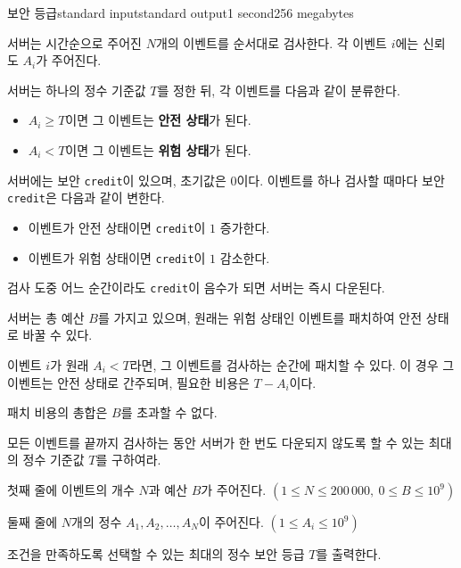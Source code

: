 \begin{problem}{보안 등급}{standard input}{standard output}{1 second}{256 megabytes}

서버는 시간순으로 주어진 $N$개의 이벤트를 순서대로 검사한다.
각 이벤트 $i$에는 신뢰도 $A_i$가 주어진다.

서버는 하나의 정수 기준값 $T$를 정한 뒤, 각 이벤트를 다음과 같이 분류한다.

\begin{itemize}
    \item $A_i \ge T$이면 그 이벤트는 \textbf{안전 상태}가 된다.
    \item $A_i < T$이면 그 이벤트는 \textbf{위험 상태}가 된다.
\end{itemize}

서버에는 보안 \texttt{credit}이 있으며, 초기값은 $0$이다.
이벤트를 하나 검사할 때마다 보안 \texttt{credit}은 다음과 같이 변한다.

\begin{itemize}
    \item 이벤트가 안전 상태이면 \texttt{credit}이 $1$ 증가한다.
    \item 이벤트가 위험 상태이면 \texttt{credit}이 $1$ 감소한다.
\end{itemize}

검사 도중 어느 순간이라도 \texttt{credit}이 음수가 되면 서버는 즉시 다운된다.

서버는 총 예산 $B$를 가지고 있으며, 원래는 위험 상태인 이벤트를 패치하여 안전 상태로 바꿀 수 있다.

이벤트 $i$가 원래 $A_i < T$라면, 그 이벤트를 검사하는 순간에 패치할 수 있다.
이 경우 그 이벤트는 안전 상태로 간주되며, 필요한 비용은 $T - A_i$이다.

패치 비용의 총합은 $B$를 초과할 수 없다.

모든 이벤트를 끝까지 검사하는 동안 서버가 한 번도 다운되지 않도록 할 수 있는 최대의 정수 기준값 $T$를 구하여라.

\InputFile
첫째 줄에 이벤트의 개수 $N$과 예산 $B$가 주어진다.
$(1 \le N \le 200\,000,\ 0 \le B \le 10^9)$

둘째 줄에 $N$개의 정수 $A_1, A_2, \dots, A_N$이 주어진다.
$(1 \le A_i \le 10^9)$

\OutputFile
조건을 만족하도록 선택할 수 있는 최대의 정수 보안 등급 $T$를 출력한다.

\Example

\begin{example}
%
\end{example}

\end{problem}

